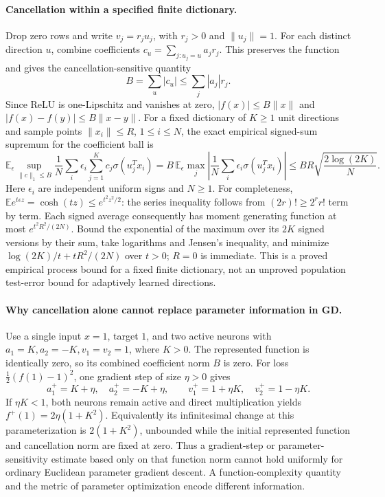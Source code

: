 \documentclass[11pt]{article}
\begin{document}
\paragraph{Cancellation within a specified finite dictionary.}
Drop zero rows and write $v_j=r_j u_j$, with $r_j>0$ and $\|u_j\|=1$.
For each distinct direction $u$, combine coefficients
$c_u=\sum_{j:u_j=u}a_jr_j$. This preserves the function and gives the
cancellation-sensitive quantity
\[
 B=\sum_u|c_u|\leq\sum_j|a_j|r_j.
\]
Since ReLU is one-Lipschitz and vanishes at zero,
$|f(x)|\leq B\|x\|$ and $|f(x)-f(y)|\leq B\|x-y\|$.
For a fixed dictionary of $K\geq1$ unit directions and sample points
$\|x_i\|\leq R$, $1\leq i\leq N$, the exact empirical signed-sum supremum
for the coefficient ball is
\[
 \mathbb E_\epsilon\sup_{\|c\|_1\leq B}
  \frac1N\sum_i\epsilon_i\sum_{j=1}^Kc_j\sigma(u_j^Tx_i)
 =B\,\mathbb E_\epsilon\max_j\left|\frac1N\sum_i
   \epsilon_i\sigma(u_j^Tx_i)\right|
 \leq BR\sqrt{\frac{2\log(2K)}N}.
\]
Here $\epsilon_i$ are independent uniform signs and $N\geq1$.
For completeness, $\mathbb E e^{t\epsilon z}=\cosh(tz)\leq e^{t^2z^2/2}$:
the series inequality follows from $(2r)!\geq2^r r!$ term by term.
Each signed average consequently has moment generating function at most
$e^{t^2R^2/(2N)}$. Bound the exponential of the maximum over its $2K$ signed
versions by their sum, take logarithms and Jensen's inequality, and minimize
$\log(2K)/t+tR^2/(2N)$ over $t>0$; $R=0$ is immediate.
This is a proved empirical process bound for a fixed finite dictionary, not an
unproved population test-error bound for adaptively learned directions.

\paragraph{Why cancellation alone cannot replace parameter information in GD.}
Use a single input $x=1$, target $1$, and two active neurons with
$a_1=K,a_2=-K,v_1=v_2=1$, where $K>0$.
The represented function is identically zero, so its combined coefficient norm
$B$ is zero. For loss $\frac12(f(1)-1)^2$, one gradient step of size
$\eta>0$ gives
\[
 a_1^+=K+\eta,\quad a_2^+=-K+\eta,
 \qquad v_1^+=1+\eta K,\quad v_2^+=1-\eta K.
\]
If $\eta K<1$, both neurons remain active and direct multiplication yields
$f^+(1)=2\eta(1+K^2)$.
Equivalently its infinitesimal change at this parameterization is
$2(1+K^2)$, unbounded while the initial represented function and cancellation
norm are fixed at zero. Thus a gradient-step or parameter-sensitivity estimate
based only on that function norm cannot hold uniformly for ordinary Euclidean
parameter gradient descent. A function-complexity quantity and the metric of
parameter optimization encode different information.
\end{document}
